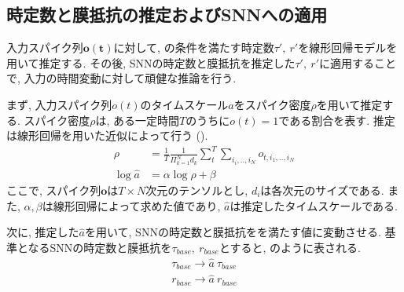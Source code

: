 \makeatletter %
\subsection{時定数と膜抵抗の推定およびSNNへの適用}
入力スパイク列$\bm{o(t)}$に対して, の条件を満たす時定数$\tau',~r'$を線形回帰モデルを用いて推定する.
その後, SNNの時定数と膜抵抗を推定した$\tau',~r'$に適用することで, 入力の時間変動に対して頑健な推論を行う.

まず, 入力スパイク列$o(t)$のタイムスケール$a$をスパイク密度$\rho$を用いて推定する.
スパイク密度$\rho$は, ある一定時間$T$のうちに$o(t)=1$である割合を表す.
推定は線形回帰を用いた近似によって行う ().
\begin{equation}
    \begin{split}
        \rho&=\frac{1}{T} \frac{1}{\Pi_{k=1}^{N}d_k} \sum_t^T \sum_{i_i,..,i_N}o_{t,i_1,..,i_N}\\
        \log{\hat{a}}&=\alpha \log{\rho} + \beta
    \end{split}
    \label{sec2:eq:reg}
\end{equation}
ここで, スパイク列$\bm{o}$は$T \times N$次元のテンソルとし, $d_i$は各次元のサイズである.
また, $\alpha, \beta$は線形回帰によって求めた値であり, $\hat{a}$は推定したタイムスケールである.

次に, 推定した$\hat{a}$を用いて, SNNの時定数と膜抵抗をを満たす値に変動させる.
基準となるSNNの時定数と膜抵抗を$\tau_{base},~r_{base}$とすると, のように表される.
\begin{equation}
    \begin{split}
        \tau_{base} \rightarrow \hat{a}~\tau_{base}\\
        r_{base} \rightarrow \hat{a}~r_{base}\\
    \end{split}
    \label{sec2:eq:replace}
\end{equation}